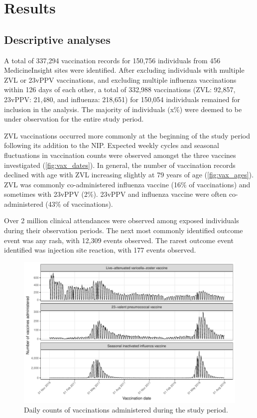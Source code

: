 \documentclass[review, endfloat]{elsarticle}
\begin{document}
\section{Results}

\subsection{Descriptive analyses}

A total of 337,294 vaccination records for 150,756 individuals from 456 MedicineInsight sites were identified. After excluding individuals with multiple ZVL or 23vPPV vaccinations, and excluding multiple influenza vaccinations within 126 days of each other, a total of 332,988 vaccinations (ZVL: 92,857, 23vPPV: 21,480, and influenza: 218,651) for 150,054 individuals remained for inclusion in the analysis. The majority of individuals (x\%) were deemed to be under observation for the entire study period.

ZVL vaccinations occurred more commonly at the beginning of the study period following its addition to the NIP. Expected weekly cycles and seasonal fluctuations in vaccination counts were observed amongst the three vaccines investigated (\autoref{fig:vax_dates}). In general, the number of vaccination records declined with age with ZVL increasing slightly at 79 years of age (\autoref{fig:vax_ages}). ZVL was commonly co-administered influenza vaccine (16\% of vaccinations) and sometimes with 23vPPV (2\%). 23vPPV and influenza vaccine were often co-administered (43\% of vaccinations).

Over 2 million clinical attendances were observed among exposed individuals during their observation periods. The next most commonly identified outcome event was any rash, with 12,309 events observed. The rarest outcome event identified was injection site reaction, with 177 events observed.

\begin{figure}
\includegraphics{figs/exposure_time_series}
\caption{Daily counts of vaccinations administered during the study period.}
\label{fig:vax_dates}
\end{figure}
\end{document}
